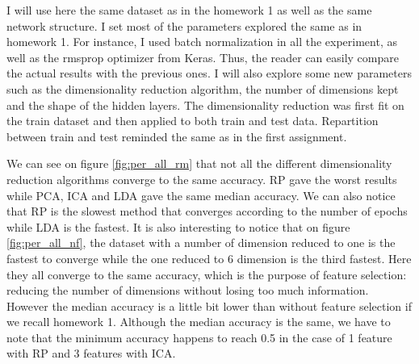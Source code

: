 \documentclass[twocolumn, 10pt]{article}
\begin{document}
			I will use here the same dataset as in the homework 1 as well as the same network structure. I set most of the parameters explored the same as in homework 1.  For instance, I used batch normalization in all the experiment, as well as the rmsprop optimizer from Keras. Thus, the reader can easily compare the actual results with the previous ones. I will also explore some new parameters such as the dimensionality reduction algorithm, the number of dimensions kept and the shape of the hidden layers. The dimensionality reduction was first fit on the train dataset and then applied to both train and test data. Repartition between train and test reminded the same as in the first assignment.

			We can see on figure \ref{fig:per_all_rm} that not all the different dimensionality reduction algorithms converge to the same accuracy. RP gave the worst results while PCA, ICA and LDA gave the same median accuracy. We can also notice that RP is the slowest method that converges according to the number of epochs while LDA is the fastest. It is also interesting to notice that on figure \ref{fig:per_all_nf}, the dataset with a number of dimension reduced to one is the fastest to converge while the one reduced to 6 dimension is the third fastest. Here they all converge to the same accuracy, which is the purpose of feature selection: reducing the number of dimensions without losing too much information. However the median accuracy is a little bit lower than without feature selection if we recall homework 1. Although the median accuracy is the same, we have to note that the minimum accuracy happens to reach 0.5 in the case of 1 feature with RP and 3 features with ICA.
\end{document}
